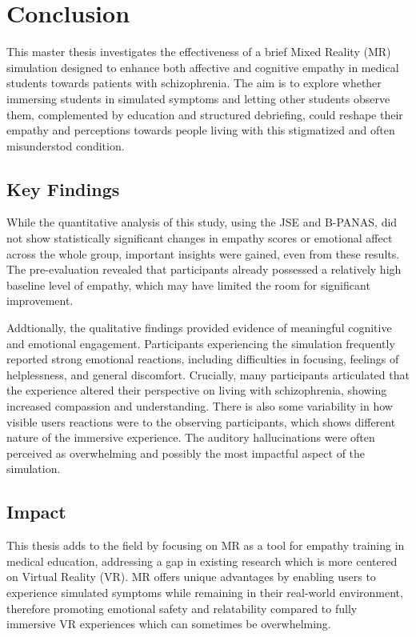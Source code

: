 \chapter{Conclusion}
\label{ch:conclusions}


This master thesis investigates the effectiveness of a brief Mixed Reality (MR) simulation designed to enhance both affective and cognitive empathy in medical students towards patients with schizophrenia. The aim is to explore whether immersing students in simulated symptoms and letting other students observe them, complemented by education and structured debriefing, could reshape their empathy and perceptions towards people living with this stigmatized and often misunderstod condition.

\section{Key Findings}
While the quantitative analysis of this study, using the JSE and B-PANAS, did not show statistically significant changes in empathy scores or emotional affect across the whole group, important insights were gained, even from these results. The pre-evaluation revealed that participants already possessed a relatively high baseline level of empathy, which may have limited the room for significant improvement.

\vspace{1em}

Addtionally, the qualitative findings provided evidence of meaningful cognitive and emotional engagement. Participants experiencing the simulation frequently reported strong emotional reactions, including difficulties in focusing, feelings of helplessness, and general discomfort. Crucially, many participants articulated that the experience altered their perspective on living with schizophrenia, showing increased compassion and understanding. There is also some variability in how visible users reactions were to the observing participants, which shows different nature of the immersive experience. The auditory hallucinations were often perceived as overwhelming and possibly the most impactful aspect of the simulation.


\section{Impact}
This thesis adds to the field by focusing on MR as a tool for empathy training in medical education, addressing a gap in existing research which is more centered on Virtual Reality (VR). MR offers unique advantages by enabling users to experience simulated symptoms while remaining in their real-world environment, therefore promoting emotional safety and relatability compared to fully immersive VR experiences which can sometimes be overwhelming.

